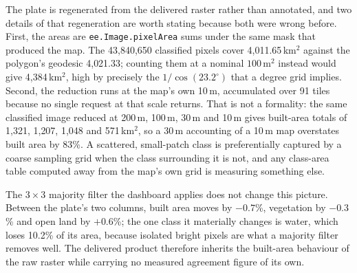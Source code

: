\documentclass[conference]{IEEEtran}
\begin{document}
The plate is regenerated from the delivered raster rather than annotated, and two details of that regeneration are worth stating because both were wrong before. First, the areas are \texttt{ee.Image.pixelArea} sums under the same mask that produced the map. The 43{,}840{,}650 classified pixels cover 4{,}011.65\,km$^2$ against the polygon's geodesic 4{,}021.33; counting them at a nominal $100\,\text{m}^2$ instead would give 4{,}384\,km$^2$, high by precisely the $1/\cos(23.2^{\circ})$ that a degree grid implies. Second, the reduction runs at the map's own 10\,m, accumulated over 91 tiles because no single request at that scale returns. That is not a formality: the same classified image reduced at 200\,m, 100\,m, 30\,m and 10\,m gives built-area totals of 1{,}321, 1{,}207, 1{,}048 and 571\,km$^2$, so a 30\,m accounting of a 10\,m map overstates built area by 83\%. A scattered, small-patch class is preferentially captured by a coarse sampling grid when the class surrounding it is not, and any class-area table computed away from the map's own grid is measuring something else.

The $3\times3$ majority filter the dashboard applies does not change this picture. Between the plate's two columns, built area moves by $-0.7$\%, vegetation by $-0.3$\% and open land by $+0.6$\%; the one class it materially changes is water, which loses 10.2\% of its area, because isolated bright pixels are what a majority filter removes well. The delivered product therefore inherits the built-area behaviour of the raw raster while carrying no measured agreement figure of its own.
\end{document}
